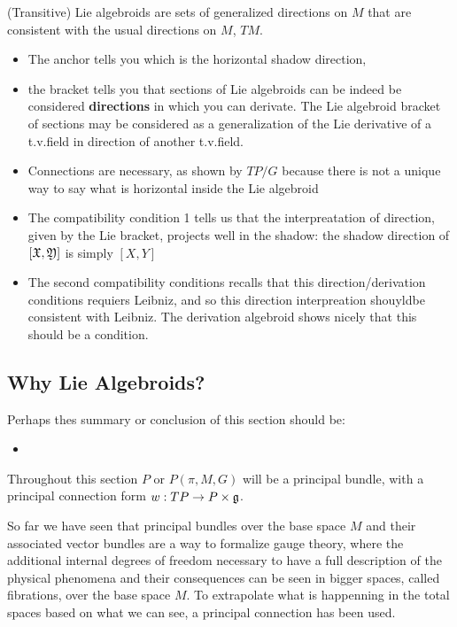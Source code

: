 (Transitive) Lie algebroids are sets of generalized directions on $M$ that are consistent with the usual directions on $M$, $TM$. 
\begin{itemize}
    \item The anchor tells you which is the horizontal shadow direction,
    \item the bracket tells you that sections of Lie algebroids can be indeed be considered \textbf{directions} in which you can derivate. The Lie algebroid bracket of sections may be considered as a generalization of the Lie derivative of a t.v.field in direction of another t.v.field.
    \item Connections are necessary, as shown by $TP/G$ because there is not a unique way to say what is horizontal inside the Lie algebroid
    \item The compatibility condition 1 tells us that the interpreatation of direction, given by the Lie bracket, projects well in the shadow: the shadow direction of $[\mathfrak{X}, \mathfrak{Y}]$ is simply $[X, Y]$
    \item The second compatibility conditions recalls that this direction/derivation conditions requiers Leibniz, and so this direction interpreation shouyldbe consistent with Leibniz. The derivation algebroid shows nicely that this should be a condition.
\end{itemize} 


\subsection{Why Lie Algebroids?}

Perhaps thes summary or conclusion of this section should be:
\begin{itemize}
    \item 
\end{itemize}

Throughout this section $P$ or $P(\pi, M, G)$ will be a principal bundle, with a principal connection form $w : TP \to P \times \mathfrak{g}$.  

So far we have seen that principal bundles over the base space $M$ and their associated vector bundles are a way to formalize gauge theory, where the additional internal degrees of freedom necessary to have a full description of the physical phenomena and their consequences can be seen in bigger spaces, called fibrations, over the base space $M$. To extrapolate what is happenning in the total spaces based on what we can see, a principal connection has been used. 

